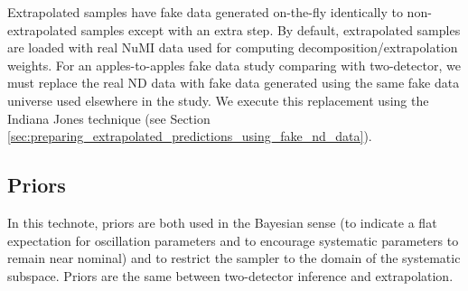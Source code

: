 \documentclass{article}
\begin{document}
Extrapolated samples have fake data generated on-the-fly identically to non-extrapolated samples except with an extra step. By default, extrapolated samples are loaded with real NuMI data used for computing decomposition/extrapolation weights. For an apples-to-apples fake data study comparing with two-detector, we must replace the real ND data with fake data generated using the same fake data universe used elsewhere in the study. We execute this replacement using the Indiana Jones technique (see Section \ref{sec:preparing_extrapolated_predictions_using_fake_nd_data}).

\subsection{Priors}
In this technote, priors are both used in the Bayesian sense (to indicate a flat expectation for oscillation parameters and to encourage systematic parameters to remain near nominal) and to restrict the sampler to the domain of the systematic subspace. Priors are the same between two-detector inference and extrapolation.
\end{document}
